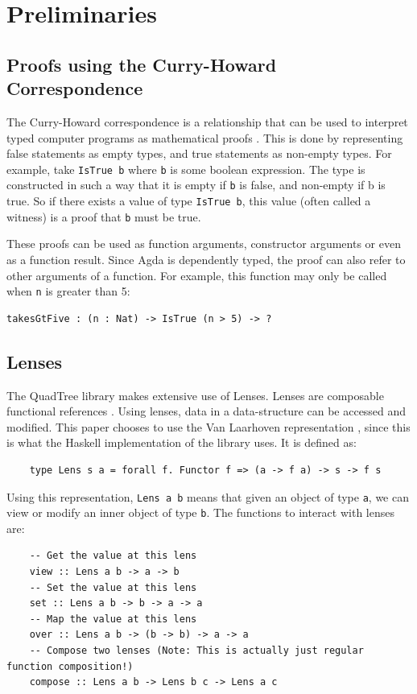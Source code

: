 \section{Preliminaries}
\subsection{Proofs using the Curry-Howard Correspondence}
The Curry-Howard correspondence is a relationship that can be used to interpret typed computer programs as mathematical proofs \cite{chc}. This is done by representing false statements as empty types, and true statements as non-empty types. For example, take  \verb|IsTrue b|  where  \verb|b| is some boolean expression. The type is constructed in such a way that it is empty if  \verb|b| is false, and non-empty if b is true.  So if there exists a value of type  \verb|IsTrue b|, this value (often called a witness) is a proof that  \verb|b| must be true. 

These proofs can be used as function arguments, constructor arguments or even as a function result. Since Agda is dependently typed, the proof can also refer to other arguments of a function. For example, this function may only be called when \verb|n| is greater than 5:
\begin{verbatim}
takesGtFive : (n : Nat) -> IsTrue (n > 5) -> ?
\end{verbatim}

\subsection{Lenses}
The QuadTree library makes extensive use of Lenses. Lenses are composable functional references \cite{lens}. Using lenses, data in a data-structure can be accessed and modified. This paper chooses to use the Van Laarhoven representation \cite{laarhovenlens}, since this is what the Haskell implementation of the library uses. It is defined as:
\begin{verbatim}
	type Lens s a = forall f. Functor f => (a -> f a) -> s -> f s
\end{verbatim}
Using this representation, \verb|Lens a b| means that given an object of type \verb|a|, we can view or modify an inner object of type \verb|b|.
The functions to interact with lenses are:
\begin{verbatim}
	-- Get the value at this lens
	view :: Lens a b -> a -> b
	-- Set the value at this lens
	set :: Lens a b -> b -> a -> a
	-- Map the value at this lens
	over :: Lens a b -> (b -> b) -> a -> a
	-- Compose two lenses (Note: This is actually just regular function composition!)
	compose :: Lens a b -> Lens b c -> Lens a c
\end{verbatim}


